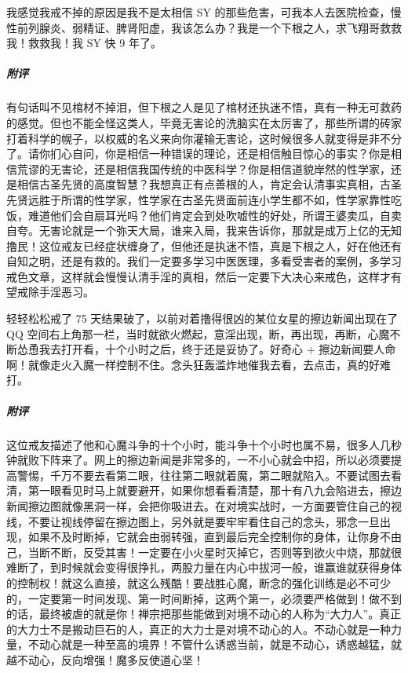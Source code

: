\begin{case}
    我感觉我戒不掉的原因是我不是太相信 SY 的那些危害，可我本人去医院检查，慢性前列腺炎、弱精证、脾肾阳虚，我该怎么办？我是一个下根之人，求飞翔哥救救我！救救我！我 SY 快 9 年了。
    \subparagraph{附评} 有句话叫不见棺材不掉泪，但下根之人是见了棺材还执迷不悟，真有一种无可救药的感觉。但也不能全怪这类人，毕竟无害论的洗脑实在太厉害了，那些所谓的砖家打着科学的幌子，以权威的名义来向你灌输无害论，这时候很多人就变得是非不分了。请你扪心自问，你是相信一种错误的理论，还是相信触目惊心的事实？你是相信荒谬的无害论，还是相信我国传统的中医科学？你是相信道貌岸然的性学家，还是相信古圣先贤的高度智慧？我想真正有点善根的人，肯定会认清事实真相，古圣先贤远胜于所谓的性学家，性学家在古圣先贤面前连小学生都不如，性学家靠性吃饭，难道他们会自扇耳光吗？他们肯定会到处吹嘘性的好处，所谓王婆卖瓜，自卖自夸。无害论就是一个弥天大局，谁来入局，我来告诉你，那就是成万上亿的无知撸民！这位戒友已经症状缠身了，但他还是执迷不悟，真是下根之人，好在他还有自知之明，还是有救的。我们一定要多学习中医医理，多看受害者的案例，多学习戒色文章，这样就会慢慢认清手淫的真相，然后一定要下大决心来戒色，这样才有望戒除手淫恶习。
\end{case}

\begin{case}
    轻轻松松戒了 75 天结果破了，以前对着撸得很凶的某位女星的擦边新闻出现在了 QQ 空间右上角那一栏，当时就欲火燃起，意淫出现，断，再出现，再断，心魔不断怂恿我去打开看，十个小时之后，终于还是妥协了。好奇心 + 擦边新闻要人命啊！就像走火入魔一样控制不住。念头狂轰滥炸地催我去看，去点击，真的好难打。
    \subparagraph{附评} 这位戒友描述了他和心魔斗争的十个小时，能斗争十个小时也属不易，很多人几秒钟就败下阵来了。网上的擦边新闻是非常多的，一不小心就会中招，所以必须要提高警惕，千万不要去看第二眼，往往第二眼就着魔，第二眼就陷入。不要试图去看清，第一眼看见时马上就要避开，如果你想看看清楚，那十有八九会陷进去，擦边新闻擦边图就像黑洞一样，会把你吸进去。在对境实战时，一方面要管住自己的视线，不要让视线停留在擦边图上，另外就是要牢牢看住自己的念头，邪念一旦出现，如果不及时断掉，它就会由弱转强，直到最后完全控制你的身体，让你身不由己，当断不断，反受其害！一定要在小火星时灭掉它，否则等到欲火中烧，那就很难断了，到时候就会变得很挣扎，两股力量在内心中拔河一般，谁赢谁就获得身体的控制权！就这么直接，就这么残酷！要战胜心魔，断念的强化训练是必不可少的，一定要第一时间发现、第一时间断掉，这两个第一，必须要严格做到！做不到的话，最终被虐的就是你！禅宗把那些能做到对境不动心的人称为“大力人”。真正的大力士不是搬动巨石的人，真正的大力士是对境不动心的人。不动心就是一种力量，不动心就是一种至高的境界！不管什么诱惑当前，就是不动心，诱惑越猛，就越不动心，反向增强！魔多反使道心坚！
\end{case}

